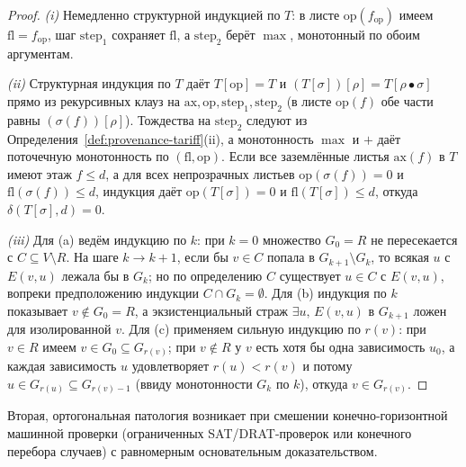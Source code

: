 \documentclass[11pt]{article}
\theoremstyle{plain}
\theoremstyle{definition}
\begin{document}
\begin{proof}
\emph{(i)} Немедленно структурной индукцией по $T$: в листе $\mathrm{op}(f_{\mathrm{op}})$ имеем $\mathrm{fl} = f_{\mathrm{op}}$, шаг $\mathrm{step}_1$ сохраняет $\mathrm{fl}$, а $\mathrm{step}_2$ берёт $\max$, монотонный по обоим аргументам.

\emph{(ii)} Структурная индукция по $T$ даёт $T[\mathrm{op}] = T$ и $(T[\sigma])[\rho] = T[\rho \bullet \sigma]$ прямо из рекурсивных клауз на $\mathrm{ax}, \mathrm{op}, \mathrm{step}_1, \mathrm{step}_2$ (в листе $\mathrm{op}(f)$ обе части равны $(\sigma(f))[\rho]$). Тождества на $\mathrm{step}_2$ следуют из Определения~\ref{def:provenance-tariff}(ii), а монотонность $\max$ и $+$ даёт поточечную монотонность по $(\mathrm{fl}, \mathrm{op})$. Если все заземлённые листья $\mathrm{ax}(f)$ в $T$ имеют этаж $f \le d$, а для всех непрозрачных листьев $\mathrm{op}(\sigma(f)) = 0$ и $\mathrm{fl}(\sigma(f)) \le d$, индукция даёт $\mathrm{op}(T[\sigma]) = 0$ и $\mathrm{fl}(T[\sigma]) \le d$, откуда $\delta(T[\sigma], d) = 0$.

\emph{(iii)} Для (a) ведём индукцию по $k$: при $k = 0$ множество $G_0 = R$ не пересекается с $C \subseteq V \setminus R$. На шаге $k \to k+1$, если бы $v \in C$ попала в $G_{k+1} \setminus G_k$, то всякая $u$ с $E(v, u)$ лежала бы в $G_k$; но по определению $C$ существует $u \in C$ с $E(v, u)$, вопреки предположению индукции $C \cap G_k = \emptyset$. Для (b) индукция по $k$ показывает $v \notin G_0 = R$, а экзистенциальный страж $\exists u,\, E(v, u)$ в $G_{k+1}$ ложен для изолированной $v$. Для (c) применяем сильную индукцию по $r(v)$: при $v \in R$ имеем $v \in G_0 \subseteq G_{r(v)}$; при $v \notin R$ у $v$ есть хотя бы одна зависимость $u_0$, а каждая зависимость $u$ удовлетворяет $r(u) < r(v)$ и потому $u \in G_{r(u)} \subseteq G_{r(v)-1}$ (ввиду монотонности $G_k$ по $k$), откуда $v \in G_{r(v)}$.
\end{proof}

Вторая, ортогональная патология возникает при смешении конечно-горизонтной машинной проверки (ограниченных SAT/DRAT-проверок или конечного перебора случаев) с равномерным основательным доказательством.
\end{document}
